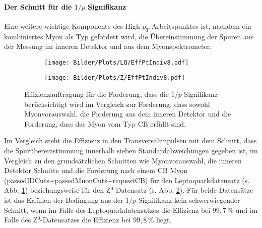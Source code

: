 \paragraph{Der Schnitt für die $1/p$ Signifikanz}$~~$\\
Eine weitere wichtige Komponente des High-$p_T$ Arbeitspunktes ist, nachdem ein kombiniertes Myon als Typ gefordert wird, die Übereinstimmung der Spuren aus der Messung im inneren Detektor und aus dem Myonspektrometer.\\ 
\begin{figure}
  \begin{subfigure}[t]{0.55\textwidth}
  \texttt{[image: Bilder/Plots/LQ/EffPtIndiv8.pdf]}
  \label{EffPtIndiv8LQ}
  \end{subfigure}
\begin{subfigure}[t]{0.55\textwidth}
 \texttt{[image: Bilder/Plots/Z/EffPtIndiv8.pdf]}
  \label{EffPtIndiv8Z}
\end{subfigure}
\caption{Effizienzauftragung für die Forderung, dass die $1/p$ Signifikanz berücksichtigt wird im Vergleich zur Forderung, dass sowohl Myonvorauswahl, die Forderung aus dem inneren Detektor und die Forderung, dass das Myon vom Typ CB erfüllt sind.}
\label{EffPtIndiv8}
\end{figure}
Im Vergleich steht die Effizienz in den Transversalimpulsen mit dem Schnitt, dass die Spurübereinstimmung innerhalb sieben Standardabweichungen gegeben ist, im Vergleich zu den grundsätzlichen Schnitten wie Myonvorauswahl, die inneren Detektor Schnitte und die Forderung nach einem CB Myon (passedIDCuts\-+passedMuonCuts\-+requestCB) für den Leptoquarkdatensatz (s. Abb. \ref{EffPtIndiv8LQ}) beziehungsweise für den Z$^0$-Datensatz (s. Abb. \ref{EffPtIndiv8Z}). Für beide Datensätze ist das Erfüllen der Bedingung aus der $1/p$ Signifikanz kein schwerwiegender Schnitt, wenn im Falle des Leptoquarkdatensatzes die Effizienz bei $99,7\,\%$ und im Falle des Z$^0$-Datensatzes die Effizienz bei $99,8\,\%$ liegt.
